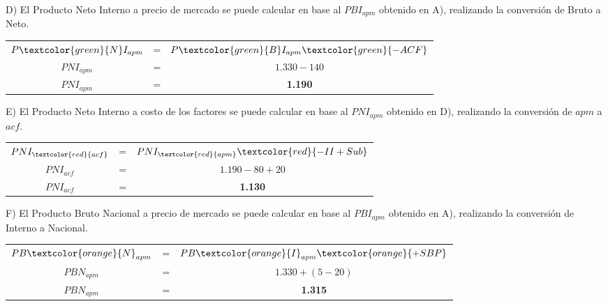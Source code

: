 \documentclass[12pt,a4paper]{article}
\begin{document}
        \hrulefill
        
        D) El Producto Neto Interno a precio de mercado se puede calcular en base al $PBI_{apm}$ obtenido en A), realizando la conversión de Bruto a Neto.
        
		\begin{table}[H]
		\centering
        	\begin{tabular}{ c c c }
               	$ P\textcolor{green}{N}I_{apm} $ &=& $ P\textcolor{green}{B}I_{apm} \textcolor{green}{ - ACF} $ \\
                $ PNI_{apm} $ &=& $ 1{.}330 - 140 $ \\
                $ PNI_{apm} $ &=& \textbf{1.190}
			\end{tabular}
		\end{table}
        
        \hrulefill
        
        E) El Producto Neto Interno a costo de los factores se puede calcular en base al $PNI_{apm}$ obtenido en D), realizando la conversión de $apm$ a $acf$.
        
		\begin{table}[H]
		\centering
        	\begin{tabular}{ c c c }
               	$ PNI_{\textcolor{red}{acf}} $ &=& $ PNI_{\textcolor{red}{apm}} \textcolor{red}{- II + Sub} $ \\
                $ PNI_{acf} $ &=& $ 1{.}190 - 80 + 20 $ \\
                $ PNI_{acf} $ &=& \textbf{1.130}
			\end{tabular}
		\end{table}
        
        \hrulefill
        
        F) El Producto Bruto Nacional a precio de mercado se puede calcular en base al $PBI_{apm}$ obtenido en A), realizando la conversión de Interno a Nacional.
        
		\begin{table}[H]
		\centering
        	\begin{tabular}{ c c c }
               	$ PB\textcolor{orange}{N}_{apm} $ &=& $ PB\textcolor{orange}{I}_{apm} \textcolor{orange}{ + SBP } $ \\
                $ PBN_{apm} $ &=& $ 1{.}330 + ( 5 - 20 ) $ \\
                $ PBN_{apm} $ &=& \textbf{1.315}
			\end{tabular}
		\end{table}
        
\end{document}
